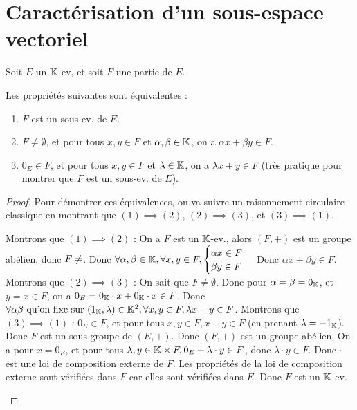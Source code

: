 \documentclass[12pt, a4paper]{report}
\begin{document}
\section{Caractérisation d'un sous-espace vectoriel}

\begin{property}
    Soit $E$ un $\mathbb{K}$-ev, et soit $F$ une partie de $E$.

    Les propriétés suivantes sont équivalentes :
    \begin{enumerate}
        \item $F$ est un sous-ev. de $E$.
        \item $F \neq \emptyset$, et pour tous $x,y\in F$ et $\alpha,\beta \in\mathbb{K}$, on a $\alpha x + \beta y \in F$.
        \item $0_E \in F$, et pour tous $x,y\in F$ et $\lambda \in\mathbb{K}$, on a $\lambda x + y \in F$ (très pratique pour montrer que $F$ est un sous-ev. de $E$).
    \end{enumerate}
\end{property}

\begin{proof}
    Pour démontrer ces équivalences, on va suivre un raisonnement circulaire classique en montrant que $(1) \implies (2)$, $(2) \implies (3)$, et $(3) \implies (1)$.

    \begin{outline}
        \1 Montrons que $(1) \implies (2)$ :
            \2 On a $F$ est un $\mathbb{K}$-ev., alors $(F,+)$ est un groupe abélien, donc $F \neq \empty$.
            \2 Donc $\forall \alpha,\beta \in \mathbb{K},\forall x,y \in F, \begin{cases}
            \alpha x \in F\\
            \beta y \in F
            \end{cases}$
            \2 Donc $\alpha x + \beta y \in F$.
        \1 Montrons que $(2) \implies (3)$ :
            \2 On sait que $F \neq \emptyset$.
            \2 Donc pour $\alpha = \beta = 0_{\mathbb{K}}$, et $y = x \in F$, on a $0_E = 0_{\mathbb{K}} \cdot x + 0_{\mathbb{K}} \cdot x \in F$.
            \2 Donc $\forall \alpha \beta \text{ qu'on fixe sur } (1_{\mathbb{K}},\lambda) \in\mathbb{K}^2, \forall x,y \in F, \lambda x + y \in F$.
        \1 Montrons que $(3) \implies (1)$ :
            \2 $0_E \in F$, et pour tous $x,y \in F, x-y \in F$ (en prenant $\lambda = -1_{\mathbb{K}}$).
            \2 Donc $F$ est un sous-groupe de $(E,+)$.
            \2 Donc $(F,+)$ est un groupe abélien.
            \2 On a pour $x = 0_E$, et pour tous $\lambda, y \in \mathbb{K}\times F, 0_E + \lambda \cdot y \in F$, donc $\lambda \cdot y \in F$.
            \2 Donc $\cdot$ est une loi de composition externe de $F$.
            \2 Les propriétés de la loi de composition externe sont vérifiées dans $F$ car elles sont vérifiées dans $E$.
            \2 Donc $F$ est un $\mathbb{K}$-ev.
    \end{outline}
\end{proof}
\end{document}
